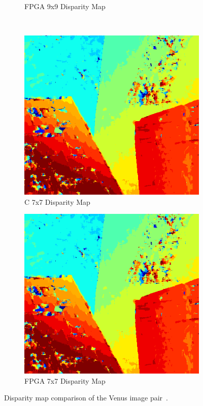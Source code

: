 \begin{figure}
\begin{center}
\begin{subfigure}{0.45\textwidth}
		\caption{FPGA 9x9 Disparity Map}
		\label{fig:venusFPGA9x9}
	\end{subfigure}
	\\
	\begin{subfigure}{0.45\textwidth}
		\includegraphics[width=\textwidth]{figures/venus_c_7x7.png}
		\caption{C 7x7 Disparity Map}
		\label{fig:venusC7x7}
	\end{subfigure}
	\begin{subfigure}{0.45\textwidth}
		\includegraphics[width=\textwidth]{figures/venus_buffer_7x7_2.png}
		\caption{FPGA 7x7 Disparity Map}
		\label{fig:venusFPGA7x7}
	\end{subfigure}
	\captionfonts
	\caption{Disparity map comparison of the Venus image pair~\cite{middlebury}.}
	\label{fig:venusDispMap}
\end{center}
\end{figure}



